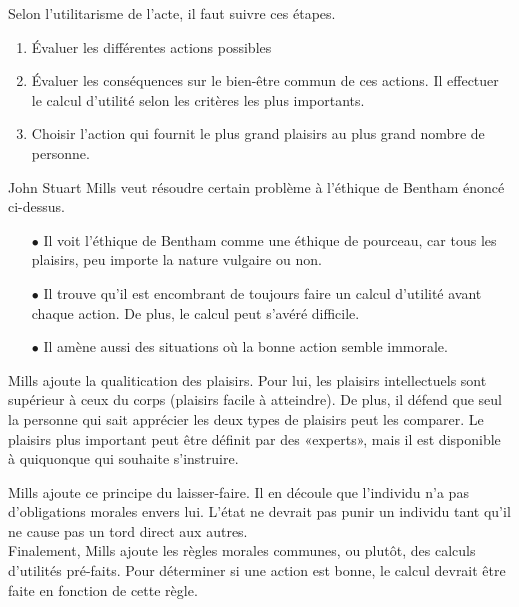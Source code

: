 \documentclass[11pt]{article}
\begin{document}
Selon l'utilitarisme de l'acte, il faut suivre ces étapes.
\begin{enumerate}
\item Évaluer les différentes actions possibles
\item Évaluer les conséquences sur le bien-être commun de ces actions. Il effectuer le calcul d'utilité selon les critères les plus importants.
\item Choisir l'action qui fournit le plus grand plaisirs au plus grand nombre de personne.\\
\end{enumerate}

John Stuart Mills veut résoudre certain problème à l'éthique de Bentham énoncé ci-dessus.
\begin{itemize}
\item[$\bullet$] Il voit l'éthique de Bentham comme une éthique de pourceau, car tous les plaisirs, peu importe la nature vulgaire ou non.
\item[$\bullet$] Il trouve qu'il est encombrant de toujours faire un calcul d'utilité avant chaque action. De plus, le calcul peut s'avéré difficile.
\item[$\bullet$] Il amène aussi des situations où la bonne action semble immorale. \\
\end{itemize}

Mills ajoute la qualitication des plaisirs. Pour lui, les plaisirs intellectuels sont supérieur à ceux du corps (plaisirs facile à atteindre). De plus, il défend que seul la personne qui sait apprécier les deux types de plaisirs peut les comparer. Le plaisirs plus important peut être définit par des «experts», mais il est disponible à quiquonque qui souhaite s'instruire.

Mills ajoute ce principe du laisser-faire. Il en découle que l'individu n'a pas d'obligations morales envers lui.  L'état ne devrait pas punir un individu tant qu'il ne cause pas un tord direct aux autres.\\

Finalement, Mills ajoute les règles morales communes, ou plutôt, des calculs d'utilités pré-faits. Pour déterminer si une action est bonne, le calcul devrait être faite en fonction de cette règle. \pagebreak
\end{document}
